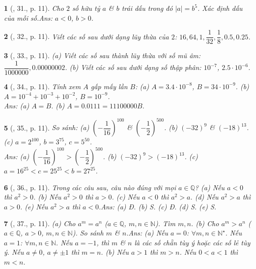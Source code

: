 \documentclass{article}
\newtheorem{baitoan}{}
\begin{document}
\begin{baitoan}[\cite{Binh_Toan_7_tap_1}, 31., p. 11]
	Cho $2$ số hữu tỷ $a$ \& $b$ trái dấu trong đó $|a| = b^5$. Xác định dấu của mỗi số.\hfill{\sf Ans: $a < 0$, $b > 0$.}
\end{baitoan}

\begin{baitoan}[\cite{Binh_Toan_7_tap_1}, 32., p. 11]
	Viết các số sau dưới dạng lũy thừa của $2$: $16,64,1,\dfrac{1}{32},\dfrac{1}{8},0.5,0.25$.
\end{baitoan}

\begin{baitoan}[\cite{Binh_Toan_7_tap_1}, 33., p. 11]
	(a) Viết các số sau thành lũy thừa với số mũ âm: $\dfrac{1}{1000000},0.00000002$. (b) Viết các số sau dưới dạng số thập phân: $10^{-7}$, $2.5\cdot 10^{-6}$.
\end{baitoan}

\begin{baitoan}[\cite{Binh_Toan_7_tap_1}, 34., p. 11]
	Tính xem $A$ gấp mấy lần $B$: (a) $A = 3.4\cdot 10^{-8}$, $B = 34\cdot 10^{-9}$. (b) $A = 10^{-4} + 10^{-3} + 10^{-2}$, $B = 10^{-9}$.\\\mbox{}\hfill{\sf Ans: (a) $A = B$. (b) $A = 0.0111 = 11 100 000B$.}
\end{baitoan}

\begin{baitoan}[\cite{Binh_Toan_7_tap_1}, 35., p. 11]
	So sánh: (a) $\left(-\dfrac{1}{16}\right)^{100}$ \& $\left(-\dfrac{1}{2}\right)^{500}$. (b) $(-32)^9$ \& $(-18)^{13}$. (c) $a = 2^{100}$, $b = 3^{75}$, $c = 5^{50}$.\\\mbox{}\hfill{\sf Ans: (a) $\left(-\dfrac{1}{16}\right)^{100} > \left(-\dfrac{1}{2}\right)^{500}$. (b) $(-32)^9 > (-18)^{13}$. (c) $a = 16^{25} < c = 25^{25} < b = 27^{25}$.}
\end{baitoan}

\begin{baitoan}[\cite{Binh_Toan_7_tap_1}, 36., p. 11]
	Trong các câu sau, câu nào đúng với mọi $a\in\mathbb{Q}$? (a) Nếu $a < 0$ thì $a^2 > 0$. (b) Nếu $a^2 > 0$ thì $a > 0$. (c) Nếu $a < 0$ thì $a^2 > a$. (d) Nếu $a^2 > a$ thì $a > 0$. (e) Nếu $a^2 > a$ thì $a < 0$.\hfill{\sf Ans: (a) Đ. (b) S. (c) Đ. (d) S. (e) S.}
\end{baitoan}

\begin{baitoan}[\cite{Binh_Toan_7_tap_1}, 37., p. 11]
	(a) Cho $a^m = a^n$ ($a\in\mathbb{Q}$, $m,n\in\mathbb{N}$). Tìm $m,n$. (b) Cho $a^m > a^n$ ($a\in\mathbb{Q}$, $a > 0$, $m,n\in\mathbb{N}$). So sánh $m$ \& $n$.\hfill{\sf Ans: (a) Nếu $a = 0$: $\forall m,n\in\mathbb{N}^\star$. Nếu $a = 1$: $\forall m,n\in\mathbb{N}$. Nếu $a = -1$, thì $m$ \& $n$ là các số chẵn tùy ý hoặc các số lẻ tùy ý. Nếu $a\ne 0$, $a\ne\pm 1$ thì $m = n$. (b) Nếu $a > 1$ thì $m > n$. Nếu $0 < a < 1$ thì $m < n$.}
\end{baitoan}
\end{document}
